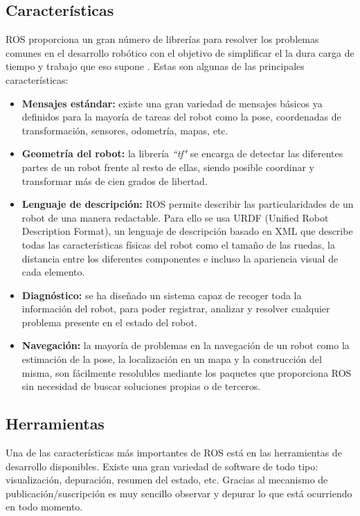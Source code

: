 \subsection{Características}
ROS proporciona un gran número de librerías para resolver los problemas comunes
en el desarrollo robótico con el objetivo de simplificar el la dura carga de
tiempo y trabajo que eso supone \cite{ROSInfraestructura}. Estas son algunas de
las principales características:

\begin{itemize}
  \item \textbf{Mensajes estándar:} existe una gran variedad de mensajes básicos
  ya definidos para la mayoría de tareas del robot como la pose, coordenadas de
  transformación, sensores, odometría, mapas, etc. 
  \item \textbf{Geometría del robot:} la librería \textit{``tf"} se encarga de
  detectar
  las diferentes partes de un robot frente al resto de ellas, siendo posible
  coordinar y transformar más de cien grados de libertad.
  \item \textbf{Lenguaje de descripción:} ROS permite describir las
  particularidades de un robot de una manera redactable. Para ello se usa URDF
  (Unified Robot Description Format), un lenguaje de descripción basado en XML
  que describe todas las características físicas del robot como el tamaño de las
  ruedas, la distancia entre los diferentes componentes e incluso la apariencia
  visual de cada elemento.
  \item \textbf{Diagnóstico:} se ha diseñado un sistema capaz de recoger toda la
  información del robot, para poder registrar, analizar y resolver cualquier
  problema presente en el estado del robot.
  \item \textbf{Navegación:} la mayoría de problemas en la navegación de un
  robot como la estimación de la pose, la localización en un mapa y la
  construcción del misma, son fácilmente resolubles mediante los paquetes que
  proporciona ROS sin necesidad de buscar soluciones propias o de terceros.
\end{itemize}

\subsection{Herramientas}
Una de las características más importantes de ROS está en las herramientas de
desarrollo disponibles. Existe una gran variedad de software de todo tipo:
visualización, depuración, resumen del estado, etc. Gracias al mecanismo de
publicación/suscripción es muy sencillo observar y depurar lo que está
ocurriendo en todo momento.

